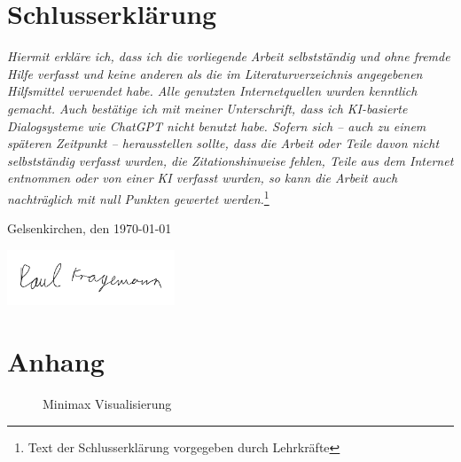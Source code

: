 \documentclass[12pt, a4paper, oneside, openright]{article}
\begin{document}
\section{Schlusserklärung}\label{sec:schlusserklarung}
\emph{
Hiermit erkläre ich, dass ich die vorliegende Arbeit selbstständig und ohne
fremde Hilfe verfasst und keine anderen als die im Literaturverzeichnis
angegebenen Hilfsmittel verwendet habe. Alle genutzten Internetquellen
wurden kenntlich gemacht.
Auch bestätige ich mit meiner Unterschrift, dass ich KI-basierte Dialogsysteme
wie ChatGPT nicht benutzt habe.
Sofern sich – auch zu einem späteren Zeitpunkt – herausstellen sollte, dass die
Arbeit oder Teile davon nicht selbstständig verfasst wurden, die
Zitationshinweise fehlen, Teile aus dem Internet entnommen oder von einer KI
verfasst wurden, so kann die Arbeit auch nachträglich mit null Punkten
gewertet werden.}\footnote{Text der Schlusserklärung vorgegeben durch Lehrkräfte}


\vspace{1cm}

Gelsenkirchen, den \today \\
\begin{center}
    \includegraphics[width=5cm]{./assets/unterschrift}
\end{center}
\newpage

\section{Anhang}\label{sec:anhang}

\begin{figure}[h]
    \centering
    
    \caption{Minimax Visualisierung\protect\footnotemark }
    \label{fig:minimax-visulisation}
\end{figure}

    \label{code}
\label{piece_square_tables}
\end{document}
